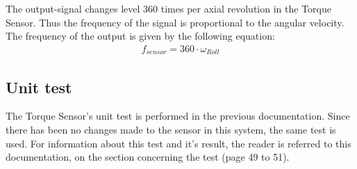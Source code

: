 The output-signal changes level 360 times per axial revolution in the Torque Sensor. Thus the frequency of the signal is proportional to the angular velocity. The frequency of the output is given by the following equation:
\begin{equation}
	\begin{split}
		f_{sensor} = 360 \cdot \omega_{Roll}
	\end{split}
\end{equation}

\subsection{Unit test}
The Torque Sensor's unit test is performed in the previous documentation. Since there has been no changes made to the sensor in this system, the same test is used. For information about this test and it's result, the reader is referred to this documentation\cite{BAC_rullefelt}, on the section concerning the test (page 49 to 51).